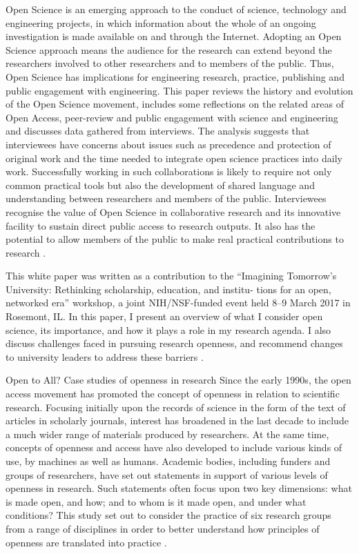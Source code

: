 Open Science is an emerging approach to the conduct of science, technology and engineering
projects, in which information about the whole of an ongoing investigation is made available
on and through the Internet. Adopting an Open Science approach means the audience for the
research can extend beyond the researchers involved to other researchers and to members of
the public. Thus, Open Science has implications for engineering research, practice,
publishing and public engagement with engineering. This paper reviews the history and
evolution of the Open Science movement, includes some reflections on the related areas of
Open Access, peer-review and public engagement with science and engineering and discusses
data gathered from interviews. The analysis suggests that interviewees have concerns about
issues such as precedence and protection of original work and the time needed to integrate
open science practices into daily work. Successfully working in such collaborations is likely
to require not only common practical tools but also the development of shared language and
understanding between researchers and members of the public. Interviewees recognise the
value of Open Science in collaborative research and its innovative facility to sustain direct
public access to research outputs. It also has the potential to allow members of the public to
make real practical contributions to research \cite{Grand2010Open}.

This white paper was written as a contribution to the “Imagining
Tomorrow’s University: Rethinking scholarship, education, and institu-
tions for an open, networked era” workshop, a joint NIH/NSF-funded
event held 8–9 March 2017 in Rosemont, IL. In this paper, I present an
overview of what I consider open science, its importance, and how it
plays a role in my research agenda. I also discuss challenges faced in
pursuing research openness, and recommend changes to university
leaders to address these barriers \cite{niemeyer2017open}.

Open to All?  Case studies of openness in research
Since the early 1990s, the open access movement has promoted the concept of openness in relation
to scientific research. Focusing initially upon the records of science in the form of the text of articles
in scholarly journals, interest has broadened in the last decade to include a much wider range of
materials produced by researchers. At the same time, concepts of openness and access have also
developed to include various kinds of use, by machines as well as humans.
Academic bodies, including funders and groups of researchers, have set out statements in support
of various levels of openness in research. Such statements often focus upon two key dimensions:
what is made open, and how; and to whom is it made open, and under what conditions? This study
set out to consider the practice of six research groups from a range of disciplines in order to better
understand how principles of openness are translated into practice \cite{Nesta2010}.

